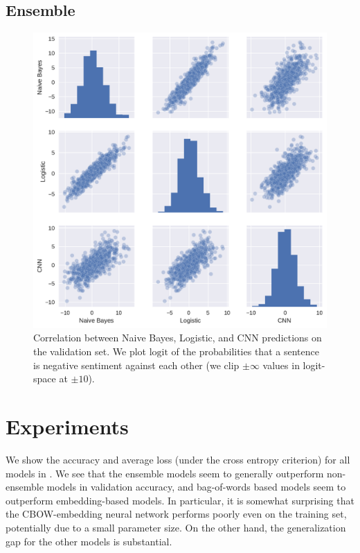 \documentclass[11pt]{article}
\begin{document}
\subsection{Ensemble}
\label{sub:ensemble}


\begin{figure}[tb]
  \centering
  \includegraphics[width=\textwidth]{corrs.pdf}
  \caption{Correlation between Naive Bayes, Logistic, and CNN predictions on
  the validation set. We plot $\text{logit}$ of the probabilities that a
  sentence is negative sentiment against each other (we clip $\pm \infty$
  values in logit-space at $\pm 10$).}
  \label{fig:corrs}
\end{figure}

\section{Experiments}
We show the accuracy and average loss (under the cross entropy criterion) for
all models in . We see that the ensemble models seem to
generally outperform non-ensemble models in validation accuracy, and
bag-of-words based models seem to outperform embedding-based models. In
particular, it is somewhat surprising that the CBOW-embedding neural network
performs poorly even on the training set, potentially due to a small parameter
size. On the other hand, the generalization gap for the other models is
substantial. 
\end{document}
